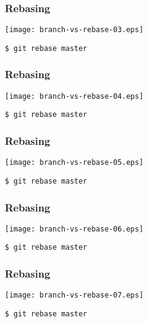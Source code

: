 \documentclass[english]{beamer}
\newcommand{\CMD}[1]{%
\texttt{\textcolor{code-green}{#1}}%
}
\begin{document}
\begin{frame}
\frametitle{Rebasing}

\texttt{[image: branch-vs-rebase-03.eps]}
\vspace{\baselineskip}
\begin{flushright}
        \CMD{\$ git rebase master}
\end{flushright}
\vspace{\textheight}
\end{frame}

\begin{frame}
\frametitle{Rebasing}

\texttt{[image: branch-vs-rebase-04.eps]}
\vspace{\baselineskip}
\begin{flushright}
        \CMD{\$ git rebase master}
\end{flushright}
\vspace{\textheight}
\end{frame}

\begin{frame}
\frametitle{Rebasing}

\texttt{[image: branch-vs-rebase-05.eps]}
\vspace{\baselineskip}
\begin{flushright}
        \CMD{\$ git rebase master}
\end{flushright}
\vspace{\textheight}
\end{frame}

\begin{frame}
\frametitle{Rebasing}

\texttt{[image: branch-vs-rebase-06.eps]}
\vspace{\baselineskip}
\begin{flushright}
        \CMD{\$ git rebase master}
\end{flushright}
\vspace{\textheight}
\end{frame}

\begin{frame}
\frametitle{Rebasing}

\texttt{[image: branch-vs-rebase-07.eps]}
\vspace{\baselineskip}
\begin{flushright}
        \CMD{\$ git rebase master}
\end{flushright}
\vspace{\textheight}
\end{frame}
\end{document}
